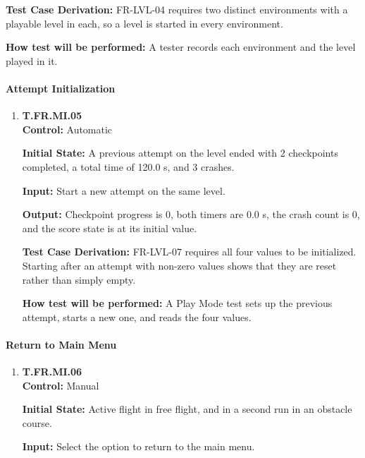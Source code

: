 \documentclass[12pt, titlepage]{article}
\begin{document}
{\begin{enumerate}
\textbf{Test Case Derivation:} \mbox{FR-LVL-04} requires two distinct environments with
a playable level in each, so a level is started in every environment.

\textbf{How test will be performed:} A tester records each environment and the level
played in it.

\end{enumerate}

\paragraph{Attempt Initialization}

\begin{enumerate}

\item{\hypertarget{test-fr-mi-05}{}\textbf{T.FR.MI.05}\\}
\textbf{Control:} Automatic

\textbf{Initial State:} A previous attempt on the level ended with 2 checkpoints
completed, a total time of 120.0 s, and 3 crashes.

\textbf{Input:} Start a new attempt on the same level.

\textbf{Output:} Checkpoint progress is 0, both timers are 0.0 s, the crash count is 0,
and the score state is at its initial value.

\textbf{Test Case Derivation:} \mbox{FR-LVL-07} requires all four values to be
initialized. Starting after an attempt with non-zero values shows that they are reset
rather than simply empty.

\textbf{How test will be performed:} A Play Mode test sets up the previous attempt,
starts a new one, and reads the four values.

\end{enumerate}

\paragraph{Return to Main Menu}

\begin{enumerate}

\item{\hypertarget{test-fr-mi-06}{}\textbf{T.FR.MI.06}\\}
\textbf{Control:} Manual

\textbf{Initial State:} Active flight in free flight, and in a second run in an obstacle
course.

\textbf{Input:} Select the option to return to the main menu.


\end{enumerate}}
\end{document}
